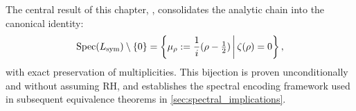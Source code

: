 \medskip

The central result of this chapter, , consolidates the analytic chain into the canonical identity:
\[
\operatorname{Spec}(L_{\mathrm{sym}}) \setminus \{0\} = \left\{ \mu_\rho := \frac{1}{i}(\rho - \tfrac{1}{2}) \,\middle|\, \zeta(\rho) = 0 \right\},
\]
with exact preservation of multiplicities. This bijection is proven unconditionally and without assuming RH, and establishes the spectral encoding framework used in subsequent equivalence theorems in \cref{sec:spectral_implications}.
